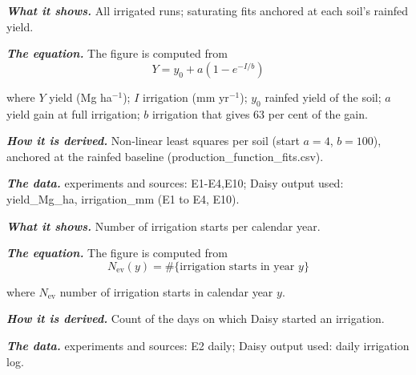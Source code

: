 \par\vspace{6pt}\noindent{}\par\nobreak
{}\label{fig:a20_11}
\par\noindent\textbf{\color{khmag}\emph{What it shows.}} All irrigated runs; saturating fits anchored at each soil's rainfed yield.
\par\noindent\textbf{\color{khmag}\emph{The equation.}} The figure is computed from
\begin{equation}\boxed{Y=y_0+a\left(1-e^{-I/b}\right)}\end{equation}
\par\noindent where $Y$ yield (Mg ha$^{-1}$); $I$ irrigation (mm yr$^{-1}$); $y_0$ rainfed yield of the soil; $a$ yield gain at full irrigation; $b$ irrigation that gives 63 per cent of the gain.
\par\noindent\textbf{\color{khmag}\emph{How it is derived.}} Non-linear least squares per soil (start $a=4$, $b=100$), anchored at the rainfed baseline (production\_function\_fits.csv).
\par\noindent\textbf{\color{khmag}\emph{The data.}} experiments and sources: E1-E4,E10; Daisy output used: yield\_Mg\_ha, irrigation\_mm (E1 to E4, E10).
\par\vspace{6pt}\noindent{}\par\nobreak
{}\label{fig:a20_12}
\par\noindent\textbf{\color{khmag}\emph{What it shows.}} Number of irrigation starts per calendar year.
\par\noindent\textbf{\color{khmag}\emph{The equation.}} The figure is computed from
\begin{equation}\boxed{N_{\mathrm{ev}}(y)=\#\{\text{irrigation starts in year } y\}}\end{equation}
\par\noindent where $N_{\mathrm{ev}}$ number of irrigation starts in calendar year $y$.
\par\noindent\textbf{\color{khmag}\emph{How it is derived.}} Count of the days on which Daisy started an irrigation.
\par\noindent\textbf{\color{khmag}\emph{The data.}} experiments and sources: E2 daily; Daisy output used: daily irrigation log.
\sol {}
